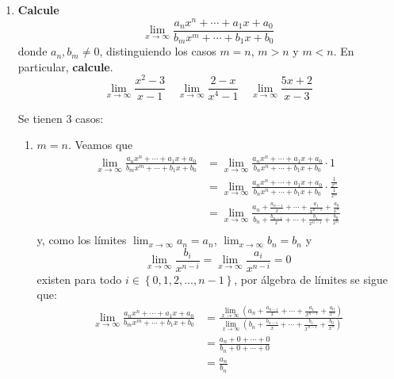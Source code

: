 \documentclass[12pt]{article}
\begin{document}
\begin{enumerate}
    \begin{sol}
    \end{sol}

    \item \textbf{Calcule}
    \begin{equation*}
        \lim_{ x\rightarrow\infty}\frac{a_nx^n+\cdots+a_1x+a_0}{b_mx^m+\cdots+b_1x+b_0}
    \end{equation*}
    donde $a_n,b_m\neq0$, distinguiendo los casos $m=n$, $m>n$ y $m<n$. En particular, \textbf{calcule}.
    \begin{equation*}
        \lim_{ x\rightarrow\infty}\frac{x^2-3}{x-1}\quad\lim_{ x\rightarrow\infty}\frac{2-x}{x^4-1}\quad\lim_{ x\rightarrow\infty}\frac{5x+2}{x-3}
    \end{equation*}

    \begin{sol}
        Se tienen 3 casos:
        \begin{enumerate}
            \item $m=n$. Veamos que
            \begin{equation*}
                \begin{split}
                    \lim_{ x\rightarrow\infty}\frac{a_nx^n+\cdots+a_1x+a_0}{b_mx^m+\cdots+b_1x+b_0}&=\lim_{ x\rightarrow\infty}\frac{a_nx^n+\cdots+a_1x+a_0}{b_nx^n+\cdots+b_1x+b_0}\cdot1 \\
                    &=\lim_{ x\rightarrow\infty}\frac{a_nx^n+\cdots+a_1x+a_0}{b_nx^n+\cdots+b_1x+b_0}\cdot\frac{\frac{1}{x^n}}{\frac{1}{x^n}}\\
                    &=\lim_{ x\rightarrow\infty}\frac{a_n+\frac{a_{ n-1}}{x}+\cdots+\frac{a_1}{x^{ n-1}}+\frac{a_0}{x^n}}{b_n+\frac{b_{ n-1}}{x}+\cdots+\frac{b_1}{x^{ n-1}}+\frac{b_0}{x^n}}\\
                \end{split}
            \end{equation*}
            y, como los límites $\lim_{ x\rightarrow\infty}a_n=a_n$, $\lim_{ x\rightarrow\infty}b_n=b_n$ y
            \begin{equation*}
                \lim_{x\rightarrow\infty}\frac{b_i}{x^{n-i}}=\lim_{x\rightarrow\infty}\frac{a_i}{x^{n-i}}=0
            \end{equation*}
            existen para todo $i\in\left\{0,1,2,...,n-1 \right\}$, por álgebra de límites se sigue que:
            \begin{equation*}
                \begin{split}
                    \lim_{ x\rightarrow\infty}\frac{a_nx^n+\cdots+a_1x+a_0}{b_mx^m+\cdots+b_1x+b_0}&=\frac{\lim_{ x\rightarrow\infty}(a_n+\frac{a_{ n-1}}{x}+\cdots+\frac{a_1}{x^{ n-1}}+\frac{a_0}{x^n})}{\lim_{ x\rightarrow\infty}(b_n+\frac{b_{ n-1}}{x}+\cdots+\frac{b_1}{x^{ n-1}}+\frac{b_0}{x^n})}\\
                    &=\frac{a_n+0+\cdots+0}{b_n+0+\cdots+0}\\
                    &=\frac{a_n}{b_n}\\
                \end{split}
            \end{equation*}


\end{enumerate}
\end{sol}
\end{enumerate}
\end{document}
